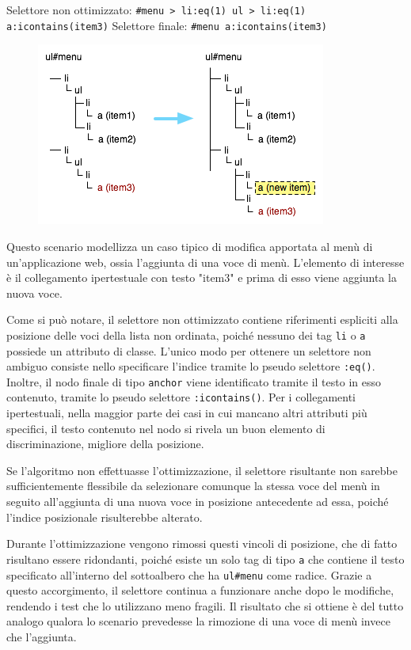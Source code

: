 \documentclass[12pt]{toptesi}
\begin{document}
Selettore non ottimizzato:  \verb|#menu > li:eq(1) ul > li:eq(1) a:icontains(item3)| 
\newline
Selettore finale:  \verb|#menu a:icontains(item3)| 

\begin{figure}[htbp]
\begin{center}
\includegraphics{images/dom_examples/menu_add_item.png}
\end{center}
\end{figure}

Questo scenario modellizza un caso tipico di modifica apportata al menù di un'applicazione web, ossia l'aggiunta di una voce di menù. L'elemento di interesse è il collegamento ipertestuale con testo "item3" e prima di esso viene aggiunta la nuova voce. 

Come si può notare, il selettore non ottimizzato contiene riferimenti espliciti alla posizione delle voci della lista non ordinata, poiché nessuno dei tag \verb|li| o \verb|a| possiede un attributo di classe. L'unico modo per ottenere un selettore non ambiguo consiste nello specificare l'indice tramite lo pseudo selettore \verb|:eq()|. Inoltre, il nodo finale di tipo \verb|anchor| viene identificato tramite il testo in esso contenuto, tramite lo pseudo selettore \verb|:icontains()|. Per i collegamenti ipertestuali, nella maggior parte dei casi in cui mancano altri attributi più specifici, il testo contenuto nel nodo si rivela un buon elemento di discriminazione, migliore della posizione.

Se l'algoritmo non effettuasse l'ottimizzazione, il selettore risultante non sarebbe sufficientemente flessibile da selezionare comunque la stessa voce del menù in seguito all'aggiunta di una nuova voce in posizione antecedente ad essa, poiché l'indice posizionale risulterebbe alterato.

Durante l'ottimizzazione vengono rimossi questi vincoli di posizione, che di fatto risultano essere ridondanti, poiché esiste un solo tag di tipo \verb|a| che contiene il testo specificato all'interno del sottoalbero che ha \verb|ul#menu| come radice. Grazie a questo accorgimento, il selettore continua  a funzionare anche dopo le modifiche, rendendo i test che lo utilizzano meno fragili. Il risultato che si ottiene è del tutto analogo qualora lo scenario prevedesse la rimozione di una voce di menù invece che l'aggiunta.
\end{document}
